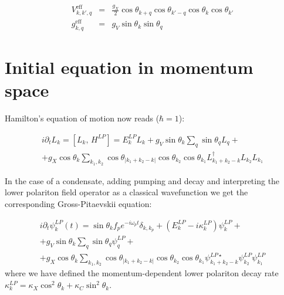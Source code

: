 \documentclass[a4paper,prb,10pt,aps,twocolumn]{revtex4-1}
\begin{document}
\begin{eqnarray*}
V_{k,k',q}^{\text{{eff}}} & = & \frac{g_{X}}{2}\cos\theta_{k+q}\cos\theta_{k'-q}\cos\theta_{k}\cos\theta_{k'}\\
g_{k,q}^{\text{{eff}}} & = & g_{V}\sin\theta_{k}\sin\theta_{q}
\end{eqnarray*}



\section{Initial equation in momentum space}
Hamilton's equation of motion now reads ($\hbar=1$):


\begin{multline}
i\partial_{t}L_{k} = [L_{k},\, H^{LP}]
  =  E_{k}^{LP}L_{k}+g_{V}\sin\theta_{k}\sum_{q}\sin\theta_{q}L_{q}+\\
  +g_{X}\cos\theta_{k}\sum_{k_{1},k_{2}}\cos\theta_{|k_{1}+k_{2}-k|}\cos\theta_{k_{2}}\cos\theta_{k_{1}}L_{k_{1}+k_{2}-k}^{\dagger}L_{k_{2}}L_{k_{1}}
\end{multline}


In the case of a condensate, adding pumping and decay and interpreting
the lower polariton field operator as a classical wavefunction we
get the corresponding Gross-Pitaevskii equation:



\begin{multline}
i\partial_{t}\psi_{k}^{LP}(t)  =  \sin\theta_{k}f_{p}e^{-i\omega_{p}t}\delta_{k,k_{p}}+\left(E_{k}^{LP}-i\kappa_{k}^{LP}\right)\psi_{k}^{LP}+\\+g_{V}\sin\theta_{k}\sum_{q}\sin\theta_{q}\psi_{q}^{LP}+\\
+g_{X}\cos\theta_{k}\sum_{k_{1},k_{2}}\cos\theta_{|k_{1}+k_{2}-k|}\cos\theta_{k_{2}}\cos\theta_{k_{1}}\psi_{k_{1}+k_{2}-k}^{LP\star}\psi_{k_{2}}^{LP}\psi_{k_{1}}^{LP}
\label{eq:gplp}
\end{multline}
where we have defined the momentum-dependent lower polariton decay rate $\kappa_{k}^{LP}=\kappa_{X}\cos^{2}\theta_{k}+\kappa_{C}\sin^{2}\theta_{k}$.
\end{document}
